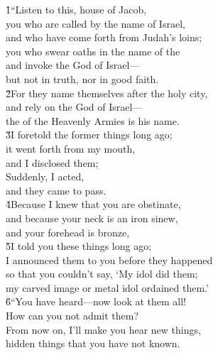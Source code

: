 \begin{poetry}
\poeml {}
\v{1}``Listen to this, house of Jacob, \\
\poemll    you who are called by the name of Israel, \\
\poemlll       and who have come forth from Judah's loins; \\
\poeml you who swear oaths in the name of the  \\
\poemll    and invoke the God of Israel--- \\
\poemlll       but not in truth, nor in good faith. \\
\poeml \v{2}For they name themselves after the holy city, \\
\poemll    and rely on the God of Israel--- \\
\poemlll       the  of the Heavenly Armies is his name. \\
\poeml \v{3}I foretold the former things long ago; \\
\poemll    it went forth from my mouth, \\
\poemlll       and I disclosed them; \\
\poeml Suddenly, I acted, \\
\poemll    and they came to pass. \\
\poeml \v{4}Because I knew that you are obstinate, \\
\poemll    and because your neck is an iron sinew, \\
\poemlll       and your forehead is bronze, \\
\poeml \v{5}I told you these things long ago; \\
\poemll    I announced them to you before they happened \\
\poeml so that you couldn't say, `My idol did them; \\
\poemll    my carved image or metal idol ordained them.' \\
\poeml \v{6}``You have heard---now look at them all! \\
\poemll    How can you not admit them? \\
\poeml From now on, I'll make you hear new things, \\
\poemll    hidden things that you have not known. \\

\end{poetry}
